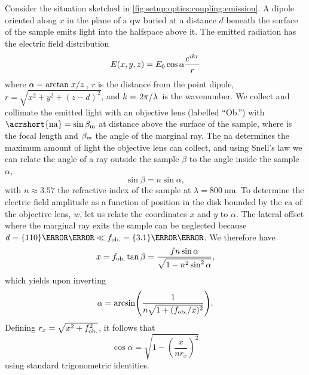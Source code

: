 \begin{marginfigure}
    
    \caption[]{}
    \label{fig:setup:optics:coupling:emission}
\end{marginfigure}

Consider the situation sketched in \cref{fig:setup:optics:coupling:emission}.
A dipole oriented along $x$ in the plane of a  \gls{qw} buried at a distance $d$ beneath the surface of the sample emits light into the halfspace above it.
The emitted radiation has the electric field distribution
\begin{equation}\label{eq:setup:optics:coupling:efield}
    E(x,y,z) = E_0\cos\alpha\frac{e^{i k r}}{r}
\end{equation}
where $\alpha=\arctan{\flatfrac{x}{z}}$, $r$ is the distance from the point dipole, $r=\sqrt{x^2+y^2+(z-d)^2}$, and $k=\flatfrac{2\pi}{\lambda}$ is the wavenumber.
We collect and collimate the emitted light with an objective lens (labelled \enquote{Ob.}) with $\mr{\acrshort{na}}=\sin\beta_\mr{m}$ at distance \fob above the surface of the sample, where \fob is the focal length and $\beta_{\mathrm{m}}$ the angle of the marginal ray.
The \gls{na} determines the maximum amount of light the objective lens can collect, and using Snell's law we can relate the angle of a ray outside the sample $\beta$ to the angle inside the sample $\alpha$,
\begin{equation}\label{eq:setup:optics:coupling:snell}
    \sin\beta = n\sin\alpha,
\end{equation}
with $n\approx 3.57$ the refractive index of the sample at $\lambda=\qty{800}{\nano\meter}$.
To determine the electric field amplitude as a function of position in the disk bounded by the \gls{ca} of the objective lens, $w$, let us relate the coordinates $x$ and $y$ to $\alpha$.
The lateral offset where the marginal ray exits the sample can be neglected because $d = \qty{110}{\nano\meter}\ll \fob=\qty{3.1}{\milli\meter}$.
We therefore have
\begin{equation}
    x = f_{\mathrm{ob.}}\tan\beta = \frac{fn\sin\alpha}{\sqrt{1-n^2\sin^2\alpha}},
\end{equation}
which yields upon inverting
\begin{equation}
    \alpha = \arcsin(\frac{1}{n\sqrt{1 + (f_{\mathrm{ob.}}/x)^2}}).
\end{equation}
Defining $r_{x}=\sqrt{x^2 + f_{\mathrm{ob.}}^2}$, it follows that
\begin{equation}
    \cos\alpha = \sqrt{1 - \left(\frac{x}{n r_{x}}\right)^2}
\end{equation}
using standard trigonometric identities.

